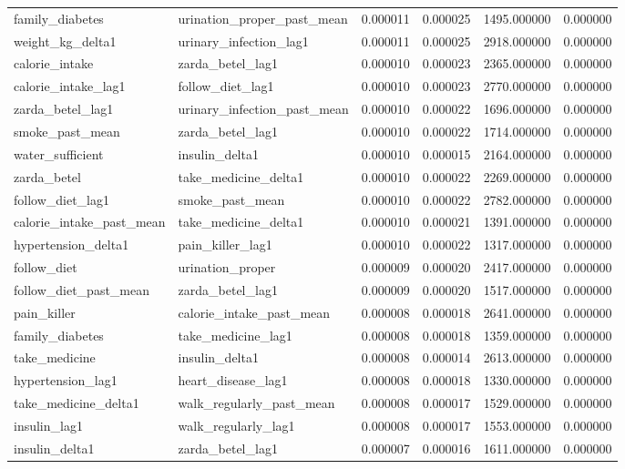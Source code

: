 \begin{longtable}{llrrrr}
family\_diabetes & urination\_proper\_past\_mean & 0.000011 & 0.000025 & 1495.000000 & 0.000000 \\
weight\_kg\_delta1 & urinary\_infection\_lag1 & 0.000011 & 0.000025 & 2918.000000 & 0.000000 \\
calorie\_intake & zarda\_betel\_lag1 & 0.000010 & 0.000023 & 2365.000000 & 0.000000 \\
calorie\_intake\_lag1 & follow\_diet\_lag1 & 0.000010 & 0.000023 & 2770.000000 & 0.000000 \\
zarda\_betel\_lag1 & urinary\_infection\_past\_mean & 0.000010 & 0.000022 & 1696.000000 & 0.000000 \\
smoke\_past\_mean & zarda\_betel\_lag1 & 0.000010 & 0.000022 & 1714.000000 & 0.000000 \\
water\_sufficient & insulin\_delta1 & 0.000010 & 0.000015 & 2164.000000 & 0.000000 \\
zarda\_betel & take\_medicine\_delta1 & 0.000010 & 0.000022 & 2269.000000 & 0.000000 \\
follow\_diet\_lag1 & smoke\_past\_mean & 0.000010 & 0.000022 & 2782.000000 & 0.000000 \\
calorie\_intake\_past\_mean & take\_medicine\_delta1 & 0.000010 & 0.000021 & 1391.000000 & 0.000000 \\
hypertension\_delta1 & pain\_killer\_lag1 & 0.000010 & 0.000022 & 1317.000000 & 0.000000 \\
follow\_diet & urination\_proper & 0.000009 & 0.000020 & 2417.000000 & 0.000000 \\
follow\_diet\_past\_mean & zarda\_betel\_lag1 & 0.000009 & 0.000020 & 1517.000000 & 0.000000 \\
pain\_killer & calorie\_intake\_past\_mean & 0.000008 & 0.000018 & 2641.000000 & 0.000000 \\
family\_diabetes & take\_medicine\_lag1 & 0.000008 & 0.000018 & 1359.000000 & 0.000000 \\
take\_medicine & insulin\_delta1 & 0.000008 & 0.000014 & 2613.000000 & 0.000000 \\
hypertension\_lag1 & heart\_disease\_lag1 & 0.000008 & 0.000018 & 1330.000000 & 0.000000 \\
take\_medicine\_delta1 & walk\_regularly\_past\_mean & 0.000008 & 0.000017 & 1529.000000 & 0.000000 \\
insulin\_lag1 & walk\_regularly\_lag1 & 0.000008 & 0.000017 & 1553.000000 & 0.000000 \\
insulin\_delta1 & zarda\_betel\_lag1 & 0.000007 & 0.000016 & 1611.000000 & 0.000000 \\

\end{longtable}
